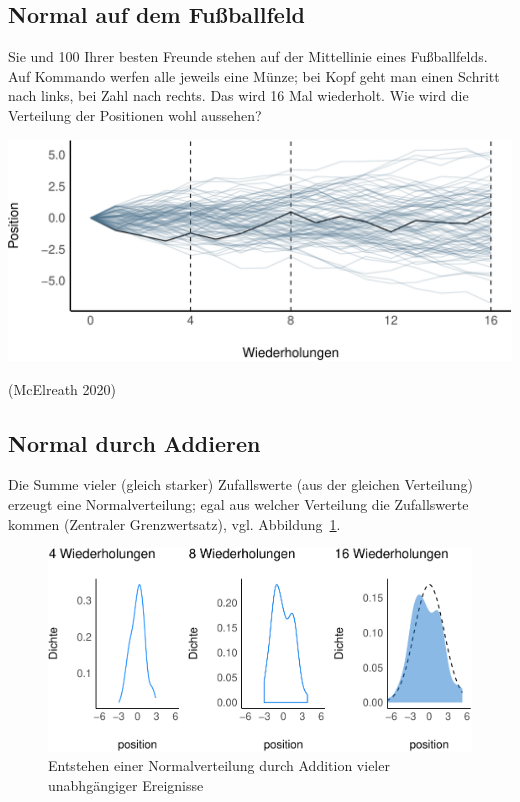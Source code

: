 \documentclass[
  a4paper,
  DIV=11]{scrreprt}
\theoremstyle{definition}
\theoremstyle{remark}
\begin{document}
\hypertarget{normal-auf-dem-fuuxdfballfeld}{%
\subsection{Normal auf dem
Fußballfeld}\label{normal-auf-dem-fuuxdfballfeld}}

Sie und 100 Ihrer besten Freunde stehen auf der Mittellinie eines
Fußballfelds. Auf Kommando werfen alle jeweils eine Münze; bei Kopf geht
man einen Schritt nach links, bei Zahl nach rechts. Das wird 16 Mal
wiederholt. Wie wird die Verteilung der Positionen wohl aussehen?

\includegraphics{./Verteilungen_files/figure-pdf/Normalverteilung-6-1.pdf}

(McElreath 2020)

\hypertarget{normal-durch-addieren}{%
\subsection{Normal durch Addieren}\label{normal-durch-addieren}}

Die Summe vieler (gleich starker) Zufallswerte (aus der gleichen
Verteilung) erzeugt eine Normalverteilung; egal aus welcher Verteilung
die Zufallswerte kommen (Zentraler Grenzwertsatz), vgl.
Abbildung~\ref{fig-fussball}.

\begin{figure}

{\centering \includegraphics[width=1\textwidth,height=\textheight]{./Verteilungen_files/figure-pdf/fig-fussball-1.pdf}

}

\caption{\label{fig-fussball}Entstehen einer Normalverteilung durch
Addition vieler unabhgängiger Ereignisse}

\end{figure}
\end{document}
